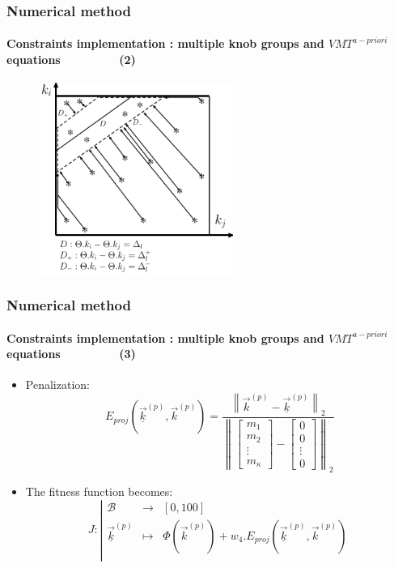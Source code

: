 \documentclass[fleqn]{beamer}
\newcommand\norm[1]{\left\lVert#1\right\rVert}
\begin{document}
\begin{frame}
	\frametitle{Numerical method}
	\framesubtitle{Constraints implementation : multiple knob groups and $VMT^{a-priori}$ equations~~~~~~~~~(2)}
	\begin{figure}
		\centering
		\includegraphics[width=2.5in]{figures/proj.pdf}	
	\end{figure}
\end{frame}


\begin{frame}
	\frametitle{Numerical method}
	\framesubtitle{Constraints implementation : multiple knob groups and $VMT^{a-priori}$ equations~~~~~~~~~(3)}
	\begin{itemize}
	 \item Penalization:
	 \begin{equation*}
	E_{proj}(\underline{\vec{k}}^{(p)},\vec{k}^{(p)})=\frac{\norm{\vec{k}^{(p)}-\underline{\vec{k}}^{(p)}}_{2}}{\norm{\begin{bmatrix}m_{1}\\m_{2}\\\vdots\\m_{\kappa}\end{bmatrix}-\begin{bmatrix}0\\0\\\vdots\\0\end{bmatrix}}_{2}}
	\end{equation*}
	\item The fitness function becomes: 
	\begin{equation*}
		J:
		\left|
  		\begin{array}{rcl}
    	\mathscr{B} & \longrightarrow &[0,100] \\
    	\underline{\vec{k}}^{(p)} & \longmapsto &  \Phi(\vec{k}^{(p)})+w_{4}.E_{proj}(\underline{\vec{k}}^{(p)},\vec{k}^{(p)}) \\
  	\end{array}
	\right.
	\end{equation*}
	\end{itemize}
\end{frame}
\end{document}
